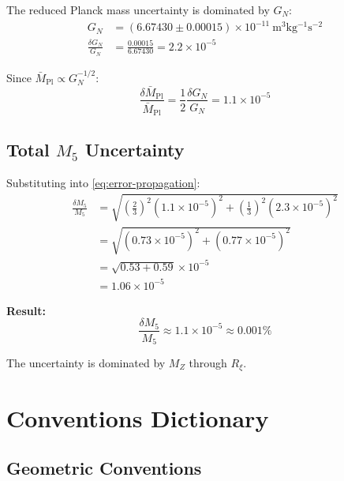 \documentclass[11pt,a4paper]{article}
\newcommand{\Rxi}{R_\xi}
\newcommand{\Mplbar}{\bar{M}_{\mathrm{Pl}}}
\newcommand{\Mfive}{M_5}
\newcommand{\GN}{G_N}
\newcommand{\MZ}{M_Z}
\begin{document}
The reduced Planck mass uncertainty is dominated by $\GN$:
\begin{align}
\GN &= (6.67430 \pm 0.00015) \times 10^{-11}~\mathrm{m^3 kg^{-1} s^{-2}} \nonumber\\
\frac{\delta\GN}{\GN} &= \frac{0.00015}{6.67430} = 2.2 \times 10^{-5}
\label{eq:GN-uncertainty}
\end{align}

Since $\Mplbar \propto \GN^{-1/2}$:
\begin{equation}
\frac{\delta\Mplbar}{\Mplbar} = \frac{1}{2}\frac{\delta\GN}{\GN} = 1.1 \times 10^{-5}
\label{eq:Mplbar-uncertainty}
\end{equation}

\subsection{Total $\Mfive$ Uncertainty}

Substituting into \eqref{eq:error-propagation}:
\begin{align}
\frac{\delta\Mfive}{\Mfive} &= \sqrt{\left(\frac{2}{3}\right)^2 (1.1 \times 10^{-5})^2
+ \left(\frac{1}{3}\right)^2 (2.3 \times 10^{-5})^2} \nonumber\\
&= \sqrt{(0.73 \times 10^{-5})^2 + (0.77 \times 10^{-5})^2} \nonumber\\
&= \sqrt{0.53 + 0.59} \times 10^{-5} \nonumber\\
&= 1.06 \times 10^{-5}
\label{eq:M5-total-error}
\end{align}

\textbf{Result:}
\begin{equation}
\boxed{\frac{\delta\Mfive}{\Mfive} \approx 1.1 \times 10^{-5} \approx 0.001\%}
\label{eq:M5-error-boxed}
\end{equation}

The uncertainty is dominated by $\MZ$ through $\Rxi$.

\section{Conventions Dictionary}

\subsection{Geometric Conventions}
\end{document}
